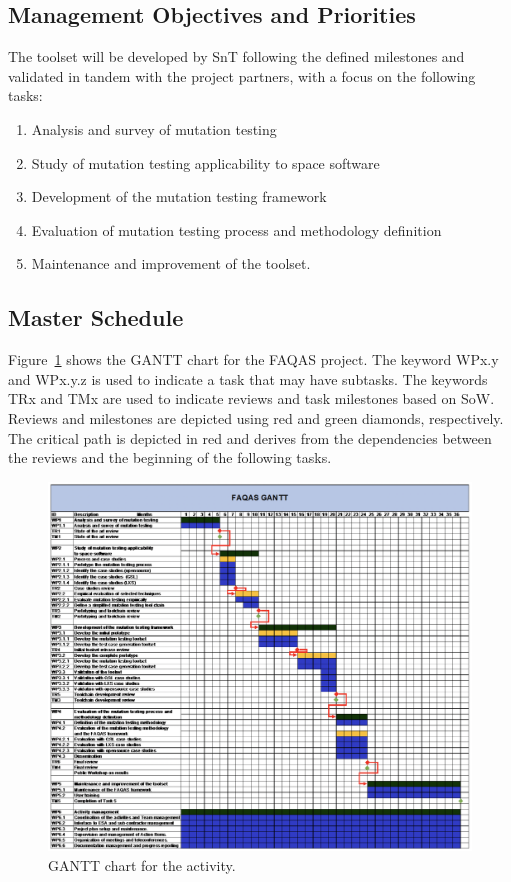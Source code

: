 \subsection{Management Objectives and Priorities}

The toolset will be developed by SnT following the defined milestones and validated in tandem with the project partners, with a focus on the following tasks:
\begin{enumerate}
  \item Analysis and survey of mutation testing
  \item Study of mutation testing applicability to space software
  \item Development of the mutation testing framework
  \item Evaluation of mutation testing process and methodology
definition
  \item Maintenance and improvement of the toolset.
\end{enumerate}


\clearpage


\subsection{Master Schedule}

Figure~\ref{fig:GANTT} shows the GANTT chart for the FAQAS project.
The keyword WPx.y and WPx.y.z is used to indicate a task that may have subtasks. The keywords TRx and TMx are used to indicate reviews and task milestones based on SoW. Reviews and milestones are depicted using red and green diamonds, respectively. The critical path is depicted in red and derives from the dependencies between the reviews and the beginning of the following tasks.

\begin{figure}[H]
\caption{GANTT chart for the activity.}
\label{fig:GANTT}
\centering
\includegraphics[width=\textwidth]{images/gantt}
\end{figure}

